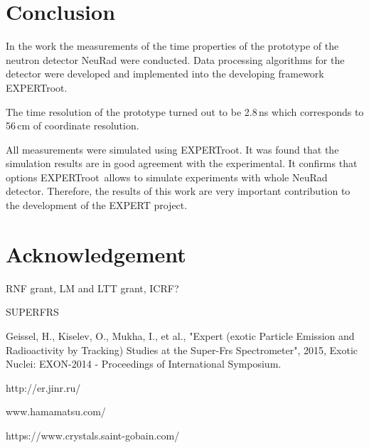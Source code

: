 \documentclass{webofc}
\newcommand{\er}{\textmd{EXPERTroot}}
\begin{document}
\section{Conclusion}

In the work the measurements of the time properties of the prototype of the neutron detector NeuRad were conducted.
Data processing algorithms for the detector were developed and implemented into the developing framework \er.

The time resolution of the prototype turned out to be 2.8\,ns which corresponds to 56\,cm of coordinate resolution.

All measurements were simulated using \er. It was found that the simulation results are in good agreement with the experimental. It confirms that options \er\, allows to simulate experiments with whole NeuRad detector.
Therefore, the results of this work are very important contribution to the development of the EXPERT project.

\section{Acknowledgement}	
RNF grant, LM and LTT grant, ICRF?

\begin{thebibliography}{999}
	
	 SUPERFRS
	
	Geissel, H., Kiselev, O., Mukha, I., et al., "Expert (exotic Particle Emission and Radioactivity by Tracking) Studies at the Super-Frs Spectrometer", 2015, Exotic Nuclei: EXON-2014 - Proceedings of International Symposium.
	
	http://er.jinr.ru/
	
	www.hamamatsu.com/
	
	https://www.crystals.saint-gobain.com/
	
\end{thebibliography}
\end{document}
